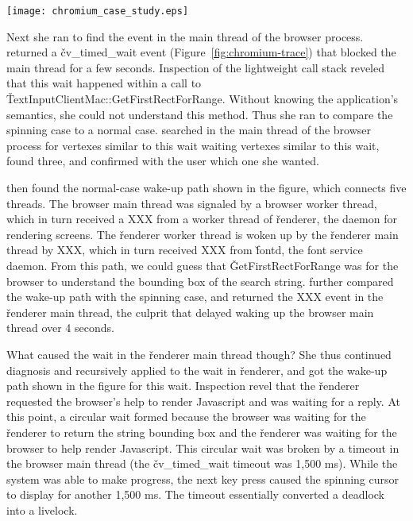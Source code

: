 \begin{figure*}[tb]
    \centering
    \texttt{[image: chromium\_case\_study.eps]}
    \caption{Chromium case study.}
    \label{fig:chromium-trace}
\end{figure*}

Next she ran \xxx to find the event in the main thread of the browser
process.  \xxx returned a \v{cv\_timed\_wait} event
(Figure~\ref{fig:chromium-trace}) that blocked the main thread for a few
seconds.  Inspection of the lightweight call stack reveled that this wait
happened within a call to \v{TextInputClientMac::GetFirstRectForRange}.
Without knowing the application's semantics, she could not understand this
method.  Thus she ran \xxx to compare the spinning case to a normal case.
\xxx searched in the main thread of the browser process for vertexes
similar to this wait waiting vertexes similar to this wait, found three,
and confirmed with the user which one she wanted.

\xxx then found the normal-case wake-up path shown in the figure, which
connects five threads.  The browser main thread was signaled by a browser
worker thread, which in turn received a XXX from a worker thread of
\v{renderer}, the daemon for rendering screens.  The \v{renderer} worker
thread is woken up by the \v{renderer} main thread by XXX, which in turn
received XXX from \v{fontd}, the font service daemon.  From this path, we
could guess that \v{GetFirstRectForRange} was for the browser to
understand the bounding box of the search string.  \xxx further compared
the wake-up path with the spinning case, and returned the XXX event in the
\v{renderer} main thread, the culprit that delayed waking up the browser
main thread over 4 seconds.

What caused the wait in the \v{renderer} main thread though?  She thus
continued diagnosis and recursively applied \xxx to the wait in
\v{renderer}, and got the wake-up path shown in the figure for this wait.
Inspection revel that the \v{renderer} requested the browser's help to
render Javascript and was waiting for a reply.  At this point, a circular
wait formed because the browser was waiting for the \v{renderer} to return
the string bounding box and the \v{renderer} was waiting for the browser
to help render Javascript.  This circular wait was broken by a timeout in
the browser main thread (the \v{cv\_timed\_wait} timeout was
1,500 ms).  While the system was able to make progress, the next key press
caused the spinning cursor to display for another 1,500 ms.  The timeout
essentially converted a deadlock into a livelock.

